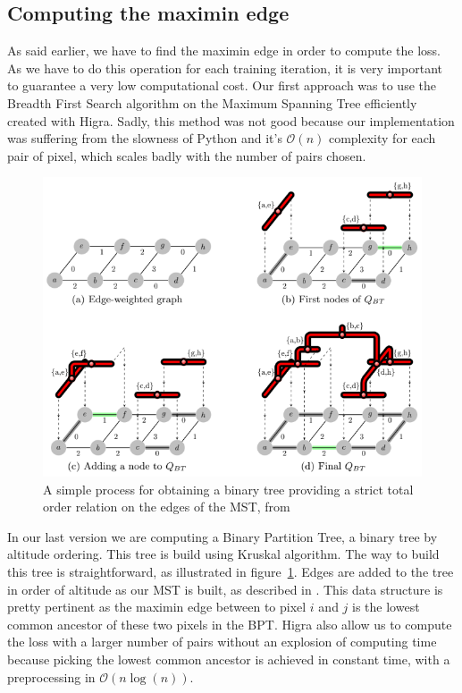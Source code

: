 \subsection{Computing the maximin edge}

As said earlier, we have to find the maximin edge in order to compute the loss.
As we have to do this operation for each training iteration, it is very important to
guarantee a very low computational cost. Our first approach was to use the
Breadth First Search algorithm on the Maximum Spanning Tree efficiently created
with Higra. Sadly, this method was not good because our implementation was
suffering from the slowness of Python and it's $\mathcal{O}(n)$ complexity for each pair of
pixel, which scales badly with the number of pairs chosen. \\

\begin{figure}[!htbp]
	\centering
	\includegraphics[width=0.7\linewidth]{./images/bpt.png}
	\caption{A simple process for obtaining a binary tree providing a strict
	total order relation on the edges of the MST, from~\cite{najman_playing_2013}}%
	\label{fig:bpt_method}
\end{figure}


In our last version we are computing a Binary Partition Tree, a binary tree by
altitude ordering. This tree is build using Kruskal algorithm. The way to build
this tree is straightforward, as illustrated in figure~\ref{fig:bpt_method}. 
Edges are added to the tree in order of altitude as our MST is built, as
described in \cite{najman_playing_2013}.
This data structure is pretty pertinent as the
maximin edge between to pixel $i$ and $j$ is the lowest common ancestor of these
two pixels in the BPT. Higra also allow us to compute the loss with a larger
number of pairs without an explosion of computing time because picking the
lowest common ancestor is achieved in constant time, with a preprocessing in
$\mathcal{O}(n\log(n))$.

